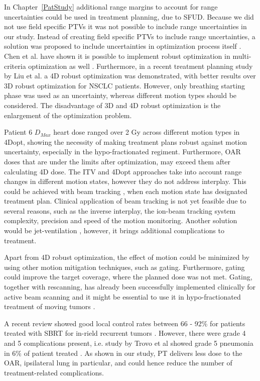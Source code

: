 \documentclass[type=dr, dr=rernat, accentcolor=tud7b,colorbacktitle, bigchapter, openright, twoside, 12pt ]{tudthesis}
\begin{document}
In Chapter~\ref{PatStudy} additional range margins to account for range uncertainties could be used in treatment planning, due to SFUD. 
Because we did not use field specific PTVs it was not possible to include range uncertainties in our study.
Instead of creating field specific PTVs to include range uncertainties, a solution was proposed to include uncertainties in optimization process itself \cite{Pflugfelder2008, Unkelbach2009, Fredriksson2011, Chen2012}.
Chen et al. have shown it is possible to implement robust optimization in multi-criteria optimization as well \cite{Chen2012}. Furthermore, in a recent treatment planning study by Liu et al. \cite{Liu2016}
a 4D robust optimization was demonstrated, with better results over 3D robust optimization for NSCLC patients. However, only breathing starting phase was used as an uncertainty,
whereas different motion types should be considered. The disadvantage of 3D and 4D robust optimization is the enlargement of the optimization problem.

Patient 6 $D_{Max}$ heart dose ranged over 2 Gy across different motion types in 4Dopt, showing the necessity of making treatment plans robust against motion uncertainty, 
especially in the hypo-fractionated regiment. Furthermore, OAR doses that are under the limits after optimization, may exceed them after calculating 4D dose. 
The ITV and 4Dopt approaches take into account range changes in different motion states, however they do not address interplay. This could be achieved with beam tracking \cite{Bert2007}, 
when each motion state has designated treatment plan. Clinical application of beam tracking is not yet feasible due to several reasons, such as the 
inverse interplay, the ion-beam tracking system complexity, precision and speed of the motion monitoring.
Another solution would be jet-ventilation \cite{Santiago2013}, however, it brings additional complications to treatment.

Apart from 4D robust optimization, the effect of motion could be minimized by using other motion mitigation techniques, such as gating. Furthermore, gating could improve the target coverage, where the planned dose was
not met. Gating, together with rescanning, has already been successfully implemented clinically for active beam scanning \cite{Rossi2016, Mori2016} and it might be essential to use it in hypo-fractionated 
treatment of moving tumors \cite{Richter2014}.

A recent review showed good local control rates between 66 - 92\% for patients treated with SBRT for in-rield recurrent tumors \cite{Amini2014}. 
However, there were grade 4 and 5 complications present, i.e. study by Trovo et al showed grade 5 pneumonia in
6\% of patient treated \cite{Trovo2014}. As shown in our study, PT delivers less dose to the OAR, ipsilateral lung in particular, and could hence reduce the number of treatment-related
complications.
\end{document}

